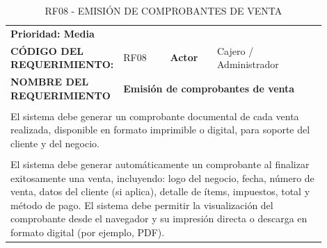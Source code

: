 \begingroup
\renewcommand{\arraystretch}{1.3}
\setlength{\tabcolsep}{6pt}
\centering
\begin{longtable}{|p{0.25\linewidth}|p{0.15\linewidth}|p{0.15\linewidth}|p{0.35\linewidth}|}
\caption{RF08 - EMISIÓN DE COMPROBANTES DE VENTA}\label{tab:rf08}\\
\hline
		\rowcolor{tableheaderblue}
		\multicolumn{4}{|l|}{\textbf{Requerimientos funcionales}}                                                                                                                                         \\ \hline
		\multicolumn{4}{|l|}{\textbf{Prioridad: Media}}                                                                                                                                                   \\ \hline
		\textbf{CÓDIGO DEL REQUERIMIENTO:}                          & RF08                                                           & \cellcolor{tableheaderblue}\textbf{Actor} & Cajero / Administrador \\ \hline
		\textbf{NOMBRE DEL REQUERIMIENTO}                           & \multicolumn{3}{l|}{\textbf{Emisión de comprobantes de venta}}                                                                      \\ \hline
		\rowcolor{tableheaderblue}
		\multicolumn{4}{|l|}{\textbf{Descripción}}                                                                                                                                                        \\ \hline
		\multicolumn{4}{|p{0.96\linewidth}|}{%
		El sistema debe generar un comprobante documental de cada venta realizada, disponible en formato imprimible o digital, para soporte del cliente y del negocio.}                                   \\ \hline
		\rowcolor{tableheaderblue}
		\multicolumn{4}{|l|}{\textbf{Funcionalidad}}                                                                                                                                                      \\ \hline
		\multicolumn{4}{|p{0.96\linewidth}|}{%
		El sistema debe generar automáticamente un comprobante al finalizar exitosamente una venta, incluyendo: logo del negocio, fecha, número de venta, datos del cliente (si aplica), detalle de ítems, impuestos, total y método de pago. \newline
		El sistema debe permitir la visualización del comprobante desde el navegador y su impresión directa o descarga en formato digital (por ejemplo, PDF). \newline
}
\end{longtable}
